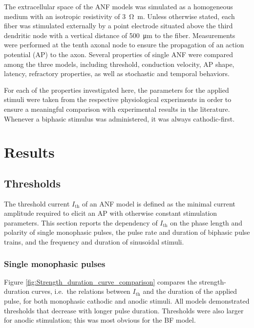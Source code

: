\documentclass[utf8]{frontiersSCNS} %
\newcommand{\T}[1]{\text{#1}}
\begin{document}
The extracellular space of the ANF models was simulated as a homogeneous medium with an isotropic resistivity of \SI{3}{\ohm\meter}. Unless otherwise stated, each fiber was stimulated externally by a point electrode situated above the third dendritic node with a vertical distance of \SI{500}{\micro\meter} to the fiber. Measurements were performed at the tenth axonal node to ensure the propagation of an action potential (AP) to the axon. Several properties of single ANF were compared among the three models, including threshold, conduction velocity, AP shape, latency, refractory properties, as well as stochastic and temporal behaviors.

For each of the properties investigated here, the parameters for the applied stimuli were taken from the respective physiological experiments in order to ensure a meaningful comparison with experimental results in the literature. Whenever a biphasic stimulus was administered, it was always cathodic-first.

\section{Results}
\label{sec:reults}

\subsection{Thresholds}
\label{subsec:thresholds}
The threshold current $I_{\T{th}}$ of an ANF model is defined as the minimal current amplitude required to elicit an AP with otherwise constant stimulation parameters. This section reports the dependency of $I_{\T{th}}$ on the phase length and polarity of single monophasic pulses, the pulse rate and duration of biphasic pulse trains, and the frequency and duration of sinusoidal stimuli.

\subsubsection{Single monophasic pulses}
\label{subsubsec:single_pulses}
Figure \ref{fig:Strength_duration_curve_comparison} compares the strength-duration curves, i.e.\ the relations between $I_{\T{th}}$ and the duration of the applied pulse, for both monophasic cathodic and anodic stimuli.
All models demonstrated thresholds that decrease with longer pulse duration. Thresholds were also larger for anodic stimulation; this was most obvious for the BF model.
\end{document}
